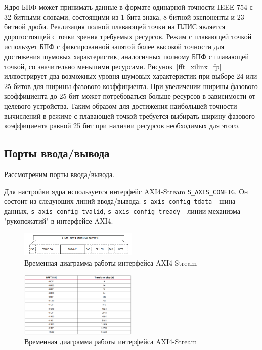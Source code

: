 Ядро БПФ может принимать данные в формате одинарной точности IEEE-754 с 32-битными словами, состоящими из 1-бита знака, 8-битной экспоненты и 23-битной дроби. Реализация полной плавающей точки на ПЛИС является дорогостоящей с точки зрения требуемых ресурсов. Режим с плавающей точкой использует БПФ с фиксированной запятой более высокой точности для достижения шумовых характеристик, аналогичных полному БПФ с плавающей точкой, со значительно меньшими ресурсами. Рисунок~\ref{fft_xilinx_fp} иллюстрирует два возможных уровня шумовых характеристик при выборе 24 или 25 битов для ширины фазового коэффициента. При увеличении ширины фазового коэффициента до 25 бит может потребоваться больше ресурсов в зависимости от целевого устройства. Таким образом для достижения наибольшей точности вычислений в режиме с плавающей точкой требуется выбирать ширину фазового коэффициента равной 25 бит при наличии ресурсов необходимых для этого.

\subsection{Порты ввода/вывода}

Рассмотреним порты ввода/вывода. 

Для настройки ядра используется интерфейс AXI4-Stream \verb|S_AXIS_CONFIG|. 
Он состоит из следующих линий ввода/вывода: \verb|s_axis_config_tdata| - шина данных,
\verb|s_axis_config_tvalid|, \verb|s_axis_config_tready| - линии механизма "рукопожатий" в интерфейсе AXI4.

\begin{figure}[h]
	\centering
	\includegraphics[width=0.5\textwidth]{image/FFT_AXIS_CONFIG.png}
	\caption{Временная диаграмма работы интерфейса AXI4-Stream}
	\label{fft_detailed_implem}
\end{figure}

\begin{figure}[h]
	\centering
	\includegraphics[width=0.5\textwidth]{image/FFT_LENGTH.PNG}
	\caption{Временная диаграмма работы интерфейса AXI4-Stream}
	\label{fft_detailed_implem}
\end{figure}

